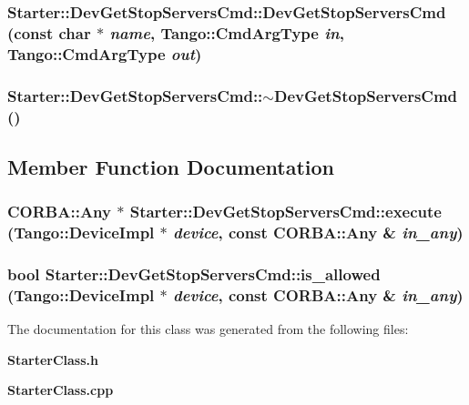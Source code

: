 \subsubsection{\setlength{\rightskip}{0pt plus 5cm}Starter::Dev\-Get\-Stop\-Servers\-Cmd::Dev\-Get\-Stop\-Servers\-Cmd (const char $\ast$ {\em name}, Tango::Cmd\-Arg\-Type {\em in}, Tango::Cmd\-Arg\-Type {\em out})}\label{classStarter_1_1DevGetStopServersCmd_a1}


\subsubsection{\setlength{\rightskip}{0pt plus 5cm}Starter::Dev\-Get\-Stop\-Servers\-Cmd::$\sim$Dev\-Get\-Stop\-Servers\-Cmd ()\hspace{0.3cm}{\tt  [inline]}}\label{classStarter_1_1DevGetStopServersCmd_a2}




\subsection{Member Function Documentation}
\subsubsection{\setlength{\rightskip}{0pt plus 5cm}CORBA::Any $\ast$ Starter::Dev\-Get\-Stop\-Servers\-Cmd::execute (Tango::Device\-Impl $\ast$ {\em device}, const CORBA::Any \& {\em in\_\-any})\hspace{0.3cm}{\tt  [virtual]}}\label{classStarter_1_1DevGetStopServersCmd_a4}


\subsubsection{\setlength{\rightskip}{0pt plus 5cm}bool Starter::Dev\-Get\-Stop\-Servers\-Cmd::is\_\-allowed (Tango::Device\-Impl $\ast$ {\em device}, const CORBA::Any \& {\em in\_\-any})\hspace{0.3cm}{\tt  [virtual]}}\label{classStarter_1_1DevGetStopServersCmd_a3}




The documentation for this class was generated from the following files:\begin{CompactItemize}
\item 
{\bf Starter\-Class.h}\item 
{\bf Starter\-Class.cpp}\end{CompactItemize}
